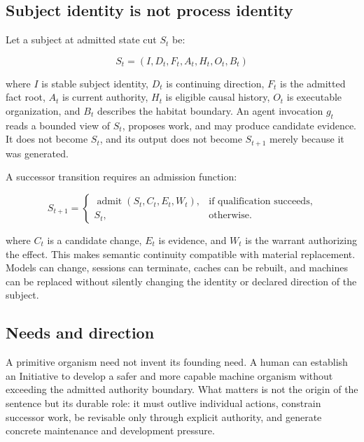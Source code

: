 \subsection{Subject identity is not process identity}

Let a subject at admitted state cut \(S_t\) be:

\begin{mlstatebox}
\[
S_t = (I, D_t, F_t, A_t, H_t, O_t, B_t)
\]
\end{mlstatebox}

where \(I\) is stable subject identity, \(D_t\) is continuing direction,
\(F_t\) is the admitted fact root, \(A_t\) is current authority, \(H_t\) is
eligible causal history, \(O_t\) is executable organization, and \(B_t\)
describes the habitat boundary. An agent invocation \(g_t\) reads a bounded
view of \(S_t\), proposes work, and may produce candidate evidence. It does not
become \(S_t\), and its output does not become \(S_{t+1}\) merely because it
was generated.

A successor transition requires an admission function:

\begin{mlstatebox}
\[
S_{t+1} =
\begin{cases}
\operatorname{admit}(S_t, C_t, E_t, W_t), & \text{if qualification succeeds},\\
S_t, & \text{otherwise}.
\end{cases}
\]
\end{mlstatebox}

where \(C_t\) is a candidate change, \(E_t\) is evidence, and \(W_t\) is the
warrant authorizing the effect. This makes semantic continuity compatible
with material replacement. Models can change, sessions can terminate, caches
can be rebuilt, and machines can be replaced without silently changing the
identity or declared direction of the subject.

\subsection{Needs and direction}

A primitive organism need not invent its founding need. A human can establish
an Initiative to develop a safer and more capable machine organism without
exceeding the admitted authority boundary. What matters is not the origin of
the sentence but its durable role: it must outlive individual actions,
constrain successor work, be revisable only through explicit authority, and
generate concrete maintenance and development pressure.


